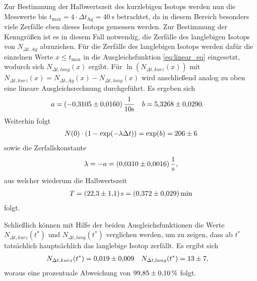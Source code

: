 \noindent
Zur Bestimmung der Halbwertszeit des kurzlebigen Isotops werden nun die Messwerte bis $t_\text{max} = 4 \cdot \Delta t_\text{Ag} = \qty[]{40}{\second}$ betrachtet,
da in diesem Bereich besonders viele Zerfälle eben dieses Isotops gemessen werden.
Zur Bestimmung der Kenngrößen ist es in diesem Fall notwendig, die Zerfälle des langlebigen Isotops von $N_{\Delta t,Ag}$ abzuziehen.
Für die Zerfälle des langlebigen Isotops werden dafür die einzelnen Werte $x \leq t_\text{max}$ in die Ausgleichsfunktion \eqref{eq:linear_eq} eingesetzt, wodurch
sich $N_{\Delta t,lang}(x)$ ergibt.
Für $\ln\left(N_{\Delta t,kurz}(x)\right)$ mit $N_{\Delta t,kurz}(x) = N_{\Delta t,Ag}(x) - N_{\Delta t,lang}(x)$ wird anschließend analog zu oben eine lineare Ausgleichsrechnung durchgeführt.
Es ergeben sich
\begin{align}
    a &= (\num{-0.3105 +- 0.0160}) \, \frac{1}{10 \unit{\second}}  & b &= \num{5.3268 +- 0.0290}.
\end{align}
Weiterhin folgt
\begin{align}
    N(0) \cdot \left(1- \exp(- \lambda \Delta t)\right) = \exp(b) = \num[]{206 +- 6}
\end{align}
sowie die Zerfallskonstante 
\begin{align}
    \lambda = - a = \qty[]{0.0310 +- 0.0016}{\per\second},
\end{align}
aus welcher wiederum die Halbwertszeit
\begin{align}
    T = \qty[]{22.3 +- 1.1}{\second} = \qty[]{0.372 +- 0.029}{\minute}
\end{align}
folgt.


\noindent
Schließlich können mit Hilfe der beiden Ausgleichsfunktionen die Werte $N_{\Delta t,kurz}(t^*)$ und $N_{\Delta t,lang}(t^*)$
verglichen werden, um zu zeigen, dass ab $t^*$ tatsächlich hauptsächlich das langlebige Isotop zerfällt.
Es ergibt sich
\begin{align*}
    N_{\Delta t,kurz}(t^*) &= \num[]{0.019 +- 0.009} & N_{\Delta t,lang}(t^*) &= \num[]{13 +- 7}, 
\end{align*}
woraus eine prozentuale Abweichung von $\num[]{99.85 +- 0.10} \, \%$ folgt.

